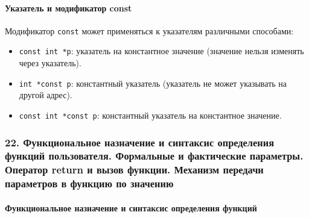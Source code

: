 \documentclass[
]{article}
\providecommand{\tightlist}{%
  \setlength{\itemsep}{0pt}\setlength{\parskip}{0pt}}
\begin{document}
\paragraph{Указатель и модификатор
const}\label{ux443ux43aux430ux437ux430ux442ux435ux43bux44c-ux438-ux43cux43eux434ux438ux444ux438ux43aux430ux442ux43eux440-const}

Модификатор \texttt{const} может применяться к указателям различными
способами:

\begin{itemize}
\tightlist
\item
  \texttt{const\ int\ *p}: указатель на константное значение (значение
  нельзя изменять через указатель).
\item
  \texttt{int\ *const\ p}: константный указатель (указатель не может
  указывать на другой адрес).
\item
  \texttt{const\ int\ *const\ p}: константный указатель на константное
  значение.
\end{itemize}

\subsubsection{22. Функциональное назначение и синтаксис определения
функций пользователя. Формальные и фактические параметры. Оператор
return и вызов функции. Механизм передачи параметров в функцию по
значению}\label{ux444ux443ux43dux43aux446ux438ux43eux43dux430ux43bux44cux43dux43eux435-ux43dux430ux437ux43dux430ux447ux435ux43dux438ux435-ux438-ux441ux438ux43dux442ux430ux43aux441ux438ux441-ux43eux43fux440ux435ux434ux435ux43bux435ux43dux438ux44f-ux444ux443ux43dux43aux446ux438ux439-ux43fux43eux43bux44cux437ux43eux432ux430ux442ux435ux43bux44f.-ux444ux43eux440ux43cux430ux43bux44cux43dux44bux435-ux438-ux444ux430ux43aux442ux438ux447ux435ux441ux43aux438ux435-ux43fux430ux440ux430ux43cux435ux442ux440ux44b.-ux43eux43fux435ux440ux430ux442ux43eux440-return-ux438-ux432ux44bux437ux43eux432-ux444ux443ux43dux43aux446ux438ux438.-ux43cux435ux445ux430ux43dux438ux437ux43c-ux43fux435ux440ux435ux434ux430ux447ux438-ux43fux430ux440ux430ux43cux435ux442ux440ux43eux432-ux432-ux444ux443ux43dux43aux446ux438ux44e-ux43fux43e-ux437ux43dux430ux447ux435ux43dux438ux44e}

\paragraph{Функциональное назначение и синтаксис определения
функций}\label{ux444ux443ux43dux43aux446ux438ux43eux43dux430ux43bux44cux43dux43eux435-ux43dux430ux437ux43dux430ux447ux435ux43dux438ux435-ux438-ux441ux438ux43dux442ux430ux43aux441ux438ux441-ux43eux43fux440ux435ux434ux435ux43bux435ux43dux438ux44f-ux444ux443ux43dux43aux446ux438ux439}
\end{document}
